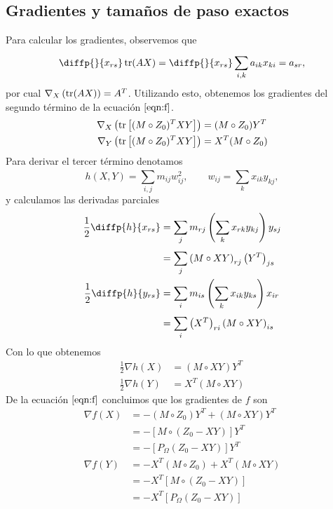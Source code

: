 \subsection{Gradientes y tamaños de paso exactos}
Para calcular los gradientes, observemos que
\begin{equation*}
    \diffp{}{{x_{rs}}} \tr(AX) = \diffp{}{{x_{rs}}} \sum_{i, k}^{} a_{ik}x_{ki} = a_{sr},
\end{equation*}
por cual $\nabla_X \left( \operatorname{tr}(AX) \right) = A^T$. Utilizando esto, obtenemos los gradientes del segundo término de la ecuación $\eqref{eqn:f}$.
\begin{align*}
    \nabla_X \left( \operatorname{tr}\left[ (M \circ Z_0)^T XY \right] \right) &= (M\circ Z_0)Y^T \\
    \nabla_Y \left( \operatorname{tr}\left[ (M \circ Z_0)^T XY \right] \right) &= X^T(M\circ Z_0) \\
\end{align*}
Para derivar el tercer término denotamos
\begin{equation*}
    h(X, Y) = \sum_{i, j}^{} m_{ij} w_{ij}^2, \qquad w_{ij} = \sum_{k}^{} x_{ik}y_{kj},
\end{equation*}
y calculamos las derivadas parciales
\begin{align*}
    \frac{1}{2}\diffp{h}{{x_{rs}}} &= \sum_{j}^{} m_{rj} \left( \sum_{k}^{} x_{rk} y_{kj} \right) y_{sj} \\
                                 &= \sum_{j}^{} \left( M \circ XY \right)_{rj} \left( Y^T \right)_{js} \\
    \frac{1}{2}\diffp{h}{{y_{rs}}} &= \sum_{i}^{} m_{is} \left( \sum_{k}^{} x_{ik} y_{ks} \right) x_{ir} \\
                                   &= \sum_{i}^{} \left( X^T \right)_{ri} \left( M \circ XY \right)_{is}
\end{align*}
Con lo que obtenemos
\begin{align*}
    \frac{1}{2} \nabla h(X) &= \left( M \circ XY \right) Y^T \\
    \frac{1}{2} \nabla h(Y) &= X^T \left( M \circ XY \right)
\end{align*}
De la ecuación $\eqref{eqn:f}$ concluimos que los gradientes de $f$ son
\begin{align*}
    \nabla f(X) &= -(M\circ Z_0) Y^T + (M\circ XY) Y^T \\
               &= -[M\circ (Z_0 - XY)] Y^T \\
               &= -\left[ P_{\Omega}(Z_0 - XY) \right] Y^T \\
    \nabla f(Y) &= -X^T(M\circ Z_0) + X^T(M\circ XY) \\
               &= -X^T[M\circ (Z_0 - XY)] \\
               &= -X^T\left[ P_{\Omega}(Z_0 - XY) \right]
\end{align*}

